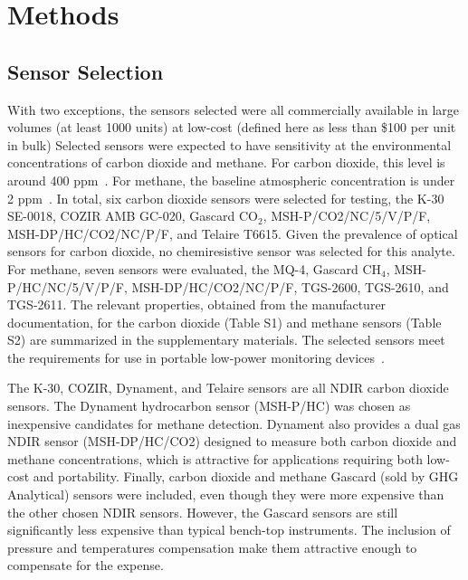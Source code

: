 \documentclass[sensors,article,submit,moreauthors,pdftex]{Definitions/mdpi}
\begin{document}
	\section{Methods}
		\label{sec:methods}
		
		\subsection{Sensor Selection}

			With two exceptions, the sensors selected were all commercially available in large volumes (at least 1000 units) at low-cost (defined here as less than \$100 per unit in bulk)
			Selected sensors were expected to have sensitivity at the environmental concentrations of carbon dioxide and methane.
			For carbon dioxide, this level is around 400 ppm~\cite{blasing_recent_2016,dlugokencky_trends_2016}.
			For methane, the baseline atmospheric concentration is under 2 ppm~\cite{turner_large_2016,bamberger_spatial_2014,dlugokencky_trends_2016-1}.
			In total, six carbon dioxide sensors were selected for testing, the K-30 SE-0018, COZIR AMB GC-020, Gascard CO$_{2}$, MSH-P/CO2/NC/5/V/P/F, MSH-DP/HC/CO2/NC/P/F, and Telaire T6615.
			Given the prevalence of optical sensors for carbon dioxide, no chemiresistive sensor was selected for this analyte.
			For methane, seven sensors were evaluated, the MQ-4, Gascard CH$_{4}$, MSH-P/HC/NC/5/V/P/F, MSH-DP/HC/CO2/NC/P/F, TGS-2600, TGS-2610, and TGS-2611.
			The relevant properties, obtained from the manufacturer documentation, for the carbon dioxide (Table S1) and methane sensors (Table S2) are summarized in the supplementary materials.
			The selected sensors meet the requirements for use in portable low-power monitoring devices~\cite{karpov_energy_2013}.
			
			The K-30, COZIR, Dynament, and Telaire sensors are all NDIR carbon dioxide sensors.
			The Dynament hydrocarbon sensor (MSH-P/HC) was chosen as inexpensive candidates for methane detection.
			Dynament also provides a dual gas NDIR sensor (MSH-DP/HC/CO2) designed to measure both carbon dioxide and methane concentrations, which is attractive for applications requiring both low-cost and portability.
			Finally, carbon dioxide and methane Gascard (sold by GHG Analytical) sensors were included, even though they were more expensive than the other chosen NDIR sensors.
			 However, the Gascard sensors are still significantly less expensive than typical bench-top instruments. The inclusion of pressure and temperatures compensation make them attractive enough to compensate for the expense.
			
\end{document}

